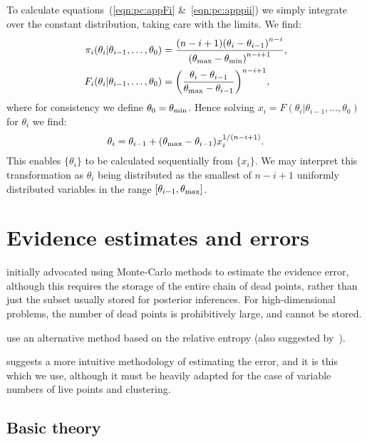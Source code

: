 To calculate equations~(\ref{eqn:pc:appFi} \&~\ref{eqn:pc:apppii}) we simply integrate over the constant distribution, taking care with the limits. We find:
\begin{align}
  \pi_i(\theta_i|\theta_{i-1},\ldots,\theta_0) &= \frac{(n-i+1){(\theta_i-\theta_{i-1})}^{n-i}}{{(\theta_{\mathrm{max}}-\theta_{\mathrm{min}})}^{n-i+1}},\\
  F_i(\theta_i|\theta_{i-1},\ldots,\theta_0) &= {\left(\frac{\theta_i-\theta_{i-1}}{\theta_{\mathrm{max}}-\theta_{i-1}}\right)}^{n-i+1},
  \label{eqn:pc:sorted_uniform_calc}
\end{align}
where for consistency we define $\theta_0 = \theta_{\mathrm{min}}$. Hence solving $x_i=F(\theta_i|\theta_{i-1},\ldots,\theta_0)$ for $\theta_i$ we find:
\begin{equation}
  \theta_i = \theta_{i-1}+ (\theta_{\mathrm{max}}-\theta_{i-1})x_i^{1/(n-i+1)}.
  \label{eqn:pc:sorted_uniform_trans}
\end{equation}
This enables $\{\theta_i\}$ to be calculated sequentially from $\{x_i\}$. We may interpret this transformation as $\theta_i$ being distributed as the smallest of $n-i+1$ uniformly distributed variables in the range $[\theta_{i-1},\theta_{\mathrm{max}}]$.







\section{Evidence estimates and errors}                            
\label{sec:pc:evidences}

\cite{skilling2006} initially advocated using Monte-Carlo methods to estimate the evidence error, although this requires the storage of the entire chain of dead points, rather than just the subset usually stored for posterior inferences. For high-dimensional problems, the number of dead points is prohibitively large, and cannot be stored.

\cite{MultiNest2} use an alternative method based on the relative entropy (also suggested by~\cite{skilling2006}). 

\cite{Keeton} suggests a more intuitive methodology of estimating the error, and it is this which we use, although it must be heavily adapted for the case of variable numbers of live points and clustering.

\subsection{Basic theory}
\label{sec:pc:basic_theory}

